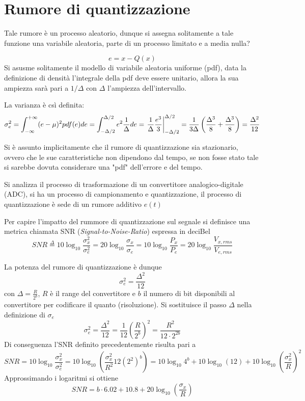 
\section{Rumore di quantizzazione}
Tale rumore è un processo aleatorio, dunque si assegna solitamente a tale
funzione una variabile aleatoria, parte di un processo limitato e a media nulla?

$$
e = x - Q(x)
$$
Si asusme solitamente il modello di variabile aleatoria uniforme (pdf), data la
definizione di densità l'integrale della pdf deve essere unitario, allora la
sua ampiezza sarà pari a $1/\Delta$ con $\Delta$ l'ampiezza dell'intervallo.

La varianza è csì definita:
$$
\sigma^2_e = \int_{-\infty}^{+\infty} (e-\mu)^2 pdf(e) de = \int_{-\Delta/2}^{\Delta/2} e^2 \frac{1}{\Delta} de =\left. \frac{1}{\Delta} \frac{e^3}{3} \right|_{-\Delta/2}^{\Delta/2} = 
\frac{1}{3\Delta} \left(\frac{\Delta^3}{8}+\frac{\Delta^3}{8}\right) = 
\frac{\Delta^2}{12}
$$

Si è assunto implicitamente che il rumore di quantizzazione sia stazionario, ovvero che le sue caratteristiche non dipendono dal tempo, se non fosse stato tale si sarebbe dovuta considerare una "pdf" dell'errore e del tempo.

Si analizza il processo di trasformazione di un convertitore analogico-digitale 
(ADC), si ha un processo di campionamento e quantizzazione, il processo di quantizzazione è sede di un rumore additivo $e(t)$

Per capire l'impatto del rummore di quantizzazione sul segnale si definisce una
metrica chiamata SNR (\textit{Signal-to-Noise-Ratio}) espressa in deciBel
$$
SNR \stackrel{\Delta}{=} 10\log_{10}\frac{\sigma_x^2}{\sigma_e^2} = 
20\log_{10}\frac{\sigma_x}{\sigma_e} = 10\log_{10}\frac{P_x}{P_e} = 
20\log_{10}\frac{V_{x,rms}}{V_{e,rms}}
$$

La potenza del rumore di quantizzazione è dunque
$$
\sigma_e^2 = \frac{\Delta^2}{12}
$$
con $\Delta = \frac{R}{2^b}$, $R$ è il range del convertitore e $b$ il numero 
di bit disponibili al convertitore per codificare il quanto (risoluzione).
Si sostituisce il passo $\Delta$ nella definizione di $\sigma_e$
$$
\sigma_e^2 = \frac{\Delta^2}{12} = \frac{1}{12}\left(\frac{R}{2^b}\right)^2 = \frac{R^2}{12\cdot 2^{2b}}
$$
Di conseguenza l'SNR definito precedentemente risulta pari a
$$
SNR = 10\log_{10}\frac{\sigma_x^2}{\sigma_e^2} = 10\log_{10}\left(\frac{\sigma_x^2}{R^2}12(2^2)^b\right) = 10\log_{10} 4^b + 10\log_{10}(12) +
10\log_{10}\left(\frac{\sigma_x^2}{R}\right)^2
$$
Approssimando i logaritmi si ottiene
$$
SNR = b\cdot 6.02 + 10.8 + 20\log_{10}\left(\frac{\sigma_x}{R}\right)
$$


